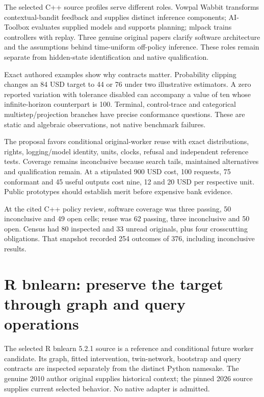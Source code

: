 The selected C++ source profiles serve different roles. Vowpal Wabbit
transforms contextual-bandit feedback and supplies distinct inference
components; AI-Toolbox evaluates supplied models and supports planning;
mlpack trains controllers with replay. Three genuine original papers
clarify software architecture and the assumptions behind time-uniform
off-policy inference. These roles remain separate from hidden-state
identification and native qualification.
\citep{exec24_policycxx_vw,exec24_policycxx_aitoolbox,exec24_policycxx_mlpack,exec24_policycxx_aitoolbox_paper,exec24_policycxx_cs2021,exec24_policycxx_anytime2024}

Exact authored examples show why contracts matter. Probability clipping
changes an 84 USD target to 44 or 76 under two illustrative estimators.
A zero reported variation with tolerance disabled can accompany a value
of ten whose infinite-horizon counterpart is 100. Terminal,
control-trace and categorical multistep/projection branches have precise
conformance questions. These are static and algebraic observations, not
native benchmark failures. \citep{exec24_policycxx_comparison}

The proposal favors conditional original-worker reuse with exact
distributions, rights, logging/model identity, units, clocks, refusal
and independent reference tests. Coverage remains inconclusive because
search tails, maintained alternatives and qualification remain. At a
stipulated 900 USD cost, 100 requests, 75 conformant and 45 useful
outputs cost nine, 12 and 20 USD per respective unit. Public prototypes
should establish merit before expensive bank evidence.
\citep{exec24_policycxx_comparison}

At the cited C++ policy review, software coverage was three passing, 50
inconclusive and 49 open cells; reuse was 62 passing, three inconclusive
and 50 open. Census had 80 inspected and 33 unread originals, plus four
crosscutting obligations. That snapshot recorded 254 outcomes of 376,
including inconclusive results.
\citep{sp24policycxx_reader,sp24policycxx_progress}

\hypertarget{r-bnlearn-preserve-the-target-through-graph-and-query-operations}{%
\section{R bnlearn: preserve the target through graph and query
operations}\label{r-bnlearn-preserve-the-target-through-graph-and-query-operations}}

The selected R bnlearn 5.2.1 source is a reference and conditional
future worker candidate. Its graph, fitted intervention, twin-network,
bootstrap and query contracts are inspected separately from the distinct
Python namesake. The genuine 2010 author original supplies historical
context; the pinned 2026 source supplies current selected behavior. No
native adapter is admitted.
\citep{exec24_bnlearn_sources,exec24_bnlearn_identity,exec24_bnlearn_original}

